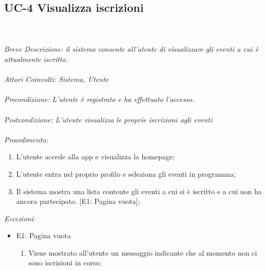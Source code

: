 \subsection{UC-4 Visualizza iscrizioni}
\\
\\
\textit{Breve Descrizione: il sistema consente all'utente di visualizzare gli eventi a cui è attualmente iscritto.} 
\\
\\
\textit{Attori Coinvolti: Sistema, Utente}
\\
\\
\textit{Precondizione: L'utente è registrato e ha effettuato l'accesso.}
\\
\\
\textit{Postcondizione: L'utente visualizza le proprie iscrizioni agli eventi}
\\
\\
\textit{Procedimento:}
\begin{enumerate}
	\item L'utente accede alla app e visualizza la homepage;
	\item L'utente entra nel proprio profilo e seleziona gli eventi in programma;
	\item Il sistema mostra una lista contente gli eventi a cui si è iscritto e a cui non ha ancora partecipato. [E1: Pagina vuota];
\end{enumerate}


\textit{Eccezioni:}
\begin{itemize}
	\item E1: Pagina vuota
	\begin{enumerate}
		\item Viene mostrato all'utente un messaggio indicante che al momento non ci sono iscrizioni in corso;
	\end{enumerate}
\end{itemize}
